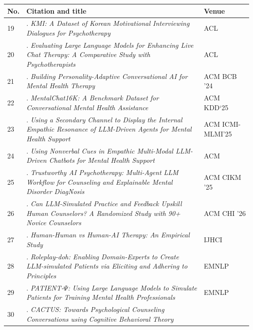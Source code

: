 \begin{table}[p]
\centering
\begin{tabular}{p{0.8cm}p{11.1cm}p{3.0cm}}
\toprule
\textbf{No.} & \textbf{Citation and title} & \textbf{Venue} \\
\midrule
19 &
\citealp{Kim2025KMI}. \textit{KMI: A Dataset of Korean Motivational Interviewing Dialogues for Psychotherapy} &
ACL \\
\midrule
20 &
\citealp{Deshpande2025Evaluating}. \textit{Evaluating Large Language Models for Enhancing Live Chat Therapy: A Comparative Study with Psychotherapists} &
ACL \\
\midrule
21 &
\citealp{Jaiswal2024Building}. \textit{Building Personality-Adaptive Conversational AI for Mental Health Therapy} &
ACM BCB '24 \\
\midrule
22 &
\citealp{Xu2025MentalChat16K}. \textit{MentalChat16K: A Benchmark Dataset for Conversational Mental Health Assistance} &
ACM KDD‘25 \\
\midrule
23 &
\citealp{Schmidmaier2025Using}. \textit{Using a Secondary Channel to Display the Internal Empathic Resonance of LLM-Driven Agents for Mental Health Support} &
ACM ICMI-MLMI'25 \\
\midrule
24 &
\citealp{Schmidmaier2025UsingNonverbal}. \textit{Using Nonverbal Cues in Empathic Multi-Modal LLM-Driven Chatbots for Mental Health Support} &
ACM \\
\midrule
25 &
\citealp{Ozgun2025Trustworthy}. \textit{Trustworthy AI Psychotherapy: Multi-Agent LLM Workflow for Counseling and Explainable Mental Disorder DiagNosis} &
ACM CIKM '25 \\
\midrule
26 &
\citealp{Louie2026Can}. \textit{Can LLM-Simulated Practice and Feedback Upskill Human Counselors? A Randomized Study with 90+ Novice Counselors} &
ACM CHI '26 \\
\midrule
27 &
\citealp{Kuhail2025Human-Human}. \textit{Human-Human vs Human-AI Therapy: An Empirical Study} &
IJHCI \\
\midrule
28 &
\citealp{Louie2024Roleplay-doh}. \textit{Roleplay-doh: Enabling Domain-Experts to Create LLM-simulated Patients via Eliciting and Adhering to Principles} &
EMNLP \\
\midrule
29 &
\citealp{Wang2024PATIENT}. \textit{PATIENT-$\Psi$: Using Large Language Models to Simulate Patients for Training Mental Health Professionals} &
EMNLP \\
\midrule
30 &
\citealp{Lee2024CACTUS}. \textit{CACTUS: Towards Psychological Counseling Conversations using Cognitive Behavioral Theory} &

\end{tabular}
\end{table}
